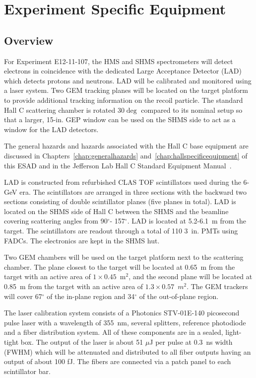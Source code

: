 \chapter{Experiment Specific Equipment}
\label{chap:expspecific}



\section{Overview}
For Experiment E12-11-107, the HMS and SHMS spectrometers will detect electrons in coincidence with the dedicated Large Acceptance Detector (LAD) which detects protons and neutrons. LAD will be calibrated and monitored using a laser system. Two GEM tracking planes will be located on the target platform to provide additional tracking information on the recoil particle. The standard Hall C scattering chamber is rotated 30$\deg$ compared to its nominal setup so that a larger, 15-in. GEP window can be used on the SHMS side to act as a window for the LAD detectors. 

The general hazards and hazards associated with the Hall C base
equipment are discussed in Chapters~\ref{chap:generalhazards}
and~\ref{chap:hallspecificequipment} of this ESAD and in the Jefferson
Lab Hall C Standard Equipment Manual~\cite{HallCosp}.

LAD is constructed from refurbished CLAS TOF scintillators used during the 6-GeV era. The scintillators are arranged in three sections with the backward two sections consisting of double scintillator planes (five planes in total). LAD is located on the SHMS side of Hall C between the SHMS and the beamline covering scattering angles from 90$^{\circ}$- 157$^{\circ}$. LAD is located at 5.2-6.1~m from the target. The scintillators are readout through a total of 110 3~in. PMTs using FADCs. The electronics are kept in the SHMS hut. 

Two GEM chambers will be used on the target platform next to the scattering chamber. The plane closest to the target will be located at 0.65~m from the target with an active area of $1\times 0.45$~m$^2$, and the second plane will be located at 0.85~m from the target with an active area of $1.3\times 0.57$~$m^2$. The GEM trackers will cover 67$^{\circ}$ of the in-plane region and 34$^{\circ}$ of the out-of-plane region.  

The laser calibration system consists of a Photonics STV-01E-140 picosecond pulse laser with a wavelength of 355~nm, several splitters, reference photodiode and a fiber distribution system. All of these components are in
a sealed, light-tight box. The output of the laser is about 51 $\mu$J per pulse at
0.3~ns width (FWHM) which will be attenuated and distributed to all fiber
outputs having an output of about 100 fJ. The fibers are connected via a patch panel to each scintillator bar.

